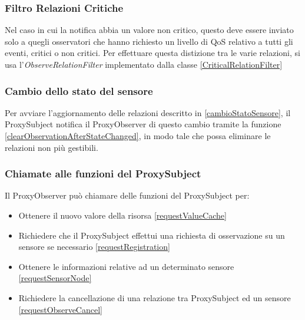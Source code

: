 			\subsubsection{Filtro Relazioni Critiche}
				Nel caso in cui la notifica abbia un valore non critico, questo deve essere inviato solo a quegli osservatori che hanno richiesto un livello di QoS relativo a tutti gli eventi, critici o non critici. Per effettuare questa distizione tra le varie relazioni, si usa l'\textit{ObserveRelationFilter} implementato dalla classe \ref{CriticalRelationFilter}
				

			\subsubsection{Cambio dello stato del sensore}
				Per avviare l'aggiornamento delle relazioni descritto in \ref{cambioStatoSensore}, il ProxySubject notifica il ProxyObserver di questo cambio tramite la funzione \ref{clearObservationAfterStateChanged}, in modo tale che possa eliminare le relazioni non più gestibili.
				

			\subsubsection{Chiamate alle funzioni del ProxySubject}
				Il ProxyObserver può chiamare delle funzioni del ProxySubject per:
				\begin{itemize}
					\item Ottenere il nuovo valore della risorsa \ref{requestValueCache}
					\item Richiedere che il ProxySubject effettui una richiesta di osservazione su un sensore se necessario \ref{requestRegistration}
					\item Ottenere le informazioni relative ad un determinato sensore \ref{requestSensorNode}
					\item Richiedere la cancellazione di una relazione tra ProxySubject ed un sensore \ref{requestObserveCancel}
				\end{itemize}

				
				
				
				

